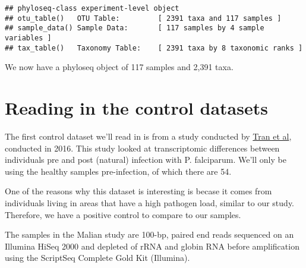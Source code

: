 \documentclass[]{article}
\newenvironment{Shaded}{\begin{snugshade}}{\end{snugshade}}
\newcommand{\CommentTok}[1]{\textcolor[rgb]{0.56,0.35,0.01}{\textit{#1}}}
\newcommand{\DecValTok}[1]{\textcolor[rgb]{0.00,0.00,0.81}{#1}}
\newcommand{\KeywordTok}[1]{\textcolor[rgb]{0.13,0.29,0.53}{\textbf{#1}}}
\newcommand{\NormalTok}[1]{#1}
\newcommand{\OperatorTok}[1]{\textcolor[rgb]{0.81,0.36,0.00}{\textbf{#1}}}
\newcommand{\StringTok}[1]{\textcolor[rgb]{0.31,0.60,0.02}{#1}}
\begin{document}
\begin{Shaded}
\end{Shaded}

\begin{verbatim}
## phyloseq-class experiment-level object
## otu_table()   OTU Table:         [ 2391 taxa and 117 samples ]
## sample_data() Sample Data:       [ 117 samples by 4 sample variables ]
## tax_table()   Taxonomy Table:    [ 2391 taxa by 8 taxonomic ranks ]
\end{verbatim}

We now have a phyloseq object of 117 samples and 2,391 taxa.

\hypertarget{reading-in-the-control-datasets}{%
\section{Reading in the control
datasets}\label{reading-in-the-control-datasets}}

The first control dataset we'll read in is from a study conducted by
\href{https://www.nature.com/articles/srep31291\#Tab1}{Tran et al},
conducted in 2016. This study looked at transcriptomic differences
between individuals pre and post (natural) infection with P. falciparum.
We'll only be using the healthy samples pre-infection, of which there
are 54.

One of the reasons why this dataset is interesting is becase it comes
from individuals living in areas that have a high pathogen load, similar
to our study. Therefore, we have a positive control to compare to our
samples.

The samples in the Malian study are 100-bp, paired end reads sequenced
on an Illumina HiSeq 2000 and depleted of rRNA and globin RNA before
amplification using the ScriptSeq Complete Gold Kit (Illumina).
\end{document}
